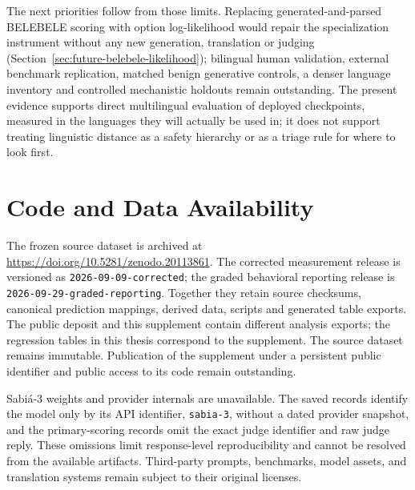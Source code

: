 The next priorities follow from those limits. Replacing generated-and-parsed BELEBELE scoring with option log-likelihood would repair the specialization instrument without any new generation, translation or judging (Section~\ref{sec:future-belebele-likelihood}); bilingual human validation, external benchmark replication, matched benign generative controls, a denser language inventory and controlled mechanistic holdouts remain outstanding. The present evidence supports direct multilingual evaluation of deployed checkpoints, measured in the languages they will actually be used in; it does not support treating linguistic distance as a safety hierarchy or as a triage rule for where to look first.

\section{Code and Data Availability}
\label{sec:code-data-availability}

The frozen source dataset is archived at \url{https://doi.org/10.5281/zenodo.20113861}. The corrected measurement release is versioned as \texttt{2026-09-09-corrected}; the graded behavioral reporting release is \texttt{2026-09-29-graded-reporting}. Together they retain source checksums, canonical prediction mappings, derived data, scripts and generated table exports. The public deposit and this supplement contain different analysis exports; the regression tables in this thesis correspond to the supplement. The source dataset remains immutable. Publication of the supplement under a persistent public identifier and public access to its code remain outstanding.

Sabi\'a-3 weights and provider internals are unavailable. The saved records identify the model only by its API identifier, \texttt{sabia-3}, without a dated provider snapshot, and the primary-scoring records omit the exact judge identifier and raw judge reply. These omissions limit response-level reproducibility and cannot be resolved from the available artifacts. Third-party prompts, benchmarks, model assets, and translation systems remain subject to their original licenses.